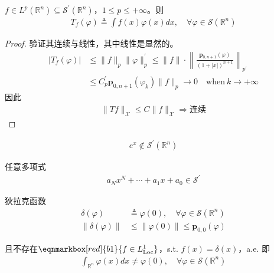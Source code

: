 \begin{example}
    $f\in L^p(\mathbb{R}^n)\subseteq \mathcal{S}^{\prime}(\mathbb{R}^n)$，$1\leqslant p\leqslant +\infty$。则
    \begin{align*}
        T_f(\varphi) \triangleq \int f(x) \varphi(x) dx,\quad \forall \varphi\in\mathcal{S}(\mathbb{R}^n)
    \end{align*}
\end{example}
\begin{proof}
    验证其连续与线性，其中线性是显然的。
    \begin{align*}
        |T_f(\varphi)| &\leqslant \|f\|_p \|\varphi\|_p^{\prime} \leqslant \|f\| \cdot \left\| \frac{\boldsymbol{p}_{0,n+1}(\varphi)}{(1+|x|)^{n+1}}\right\|_{p^{\prime}} \\
        & \leqslant C_p^{\prime} \boldsymbol{p}_{0,n+1}(\varphi_k) \|f\|_p \to 0 \quad \text{when}\ k\to+\infty
    \end{align*}
    因此
    \begin{align*}
        \|Tf\|_{\mathscr{X}} \leqslant C\|f\|_{\mathscr{X}} \Rightarrow \text{连续}
    \end{align*}
\end{proof}
\begin{remark}
    \begin{align*}
        e^x \notin \mathcal{S}^{\prime}(\mathbb{R}^n)
    \end{align*}
\end{remark}

\begin{proposition}
    任意多项式 
    \begin{align*}
        a_N x^N + \cdots + a_1 x + a_0 \in \mathcal{S}^{\prime}
    \end{align*}
\end{proposition}

\begin{proposition}
    狄拉克函数
    \begin{align*}
        \delta(\varphi) &\triangleq \varphi(0),\quad \forall\varphi\in \mathcal{S}(\mathbb{R}^n) \\
        \|\delta(\varphi)\| &\leqslant \|\varphi(0)\| \leqslant \boldsymbol{p}_{0,0} (\varphi)
    \end{align*}

    且不存在$\eqnmarkbox[red]{b1}{f\in L^1_{\operatorname{Loc}}}$，s.t. $f(x) = \delta(x)$，a.e.
    即
    \begin{align*}
        \int_{\mathbb{R}^n} \varphi(x) dx \neq \varphi(0),\quad \forall \varphi \in\mathcal{S}(\mathbb{R}^n)
    \end{align*}
\end{proposition}

